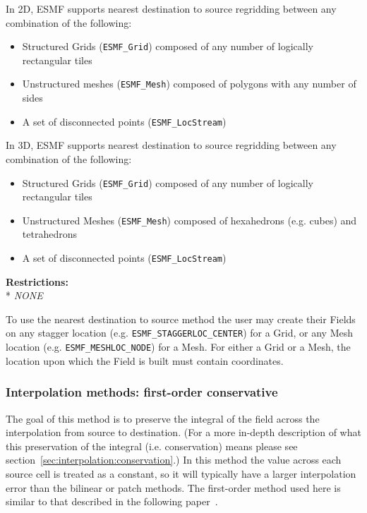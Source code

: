 \smallskip

 In 2D, ESMF supports nearest destination to source regridding between any combination of the following:
 \begin{itemize}
 \item Structured Grids ({\tt ESMF\_Grid}) composed of any number of logically rectangular tiles
 \item Unstructured meshes ({\tt ESMF\_Mesh}) composed of polygons with any number of sides
 \item A set of disconnected points ({\tt ESMF\_LocStream}) 
 \end{itemize}

\smallskip

 In 3D, ESMF supports nearest destination to source regridding between any combination of the following:
 \begin{itemize}
 \item Structured Grids ({\tt ESMF\_Grid}) composed of any number of logically rectangular tiles
 \item Unstructured Meshes ({\tt ESMF\_Mesh}) composed of hexahedrons (e.g. cubes) and tetrahedrons
 \item A set of disconnected points ({\tt ESMF\_LocStream}) 
 \end{itemize}

\smallskip

\textbf{Restrictions:}\\*
\textit{NONE}

\smallskip

 To use the nearest destination to source method the user may create their Fields on any stagger location (e.g. {\tt ESMF\_STAGGERLOC\_CENTER}) for a Grid, or
 any Mesh location (e.g. {\tt ESMF\_MESHLOC\_NODE}) for a Mesh. For either a Grid or a Mesh, the location upon which the Field is built 
 must contain coordinates. 

\subsubsection{Interpolation methods: first-order conservative}\label{sec:interpolation:conserve}
 The goal of this method is to preserve the integral of the field across the interpolation from source to destination.  
 (For a more in-depth description of what this preservation of the integral (i.e. conservation) means please see section~\ref{sec:interpolation:conservation}.)  In this method the value across each source cell is treated as a constant, so it will typically have a larger 
 interpolation error than the bilinear or patch methods.  The first-order method used here is similar to that described in the following paper~\cite{ConservativeOrder1}.

